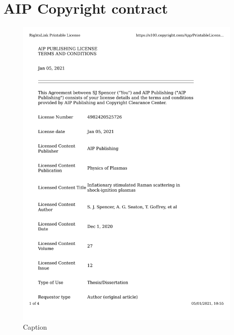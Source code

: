
\chapter{AIP Copyright contract}
\begin{figure}
    \centering
    \includegraphics[width=\columnwidth]{Chapters/C4_iSRS/iSRS_license_agreement.pdf}
    \caption{Caption}
    \label{fig:my_label}
\end{figure}